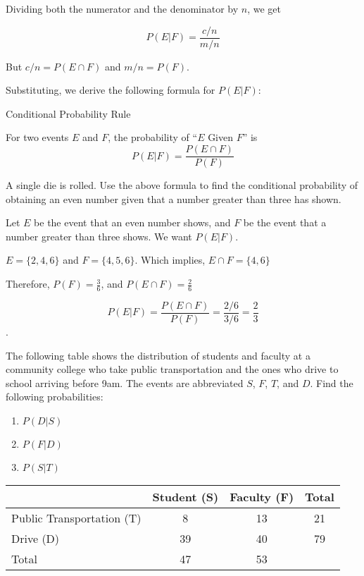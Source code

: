 Dividing both the numerator and the denominator by \(n\), we get

\[
    P(E | F) = \frac{c/n}{m/n}
\]

But \(c/n = P(E \cap F)\) and \(m/n = P(F)\).

Substituting, we derive the following formula for \(P(E | F)\):

\begin{summarybox}{Conditional Probability Rule}

    For two events $E$ and $F$, the probability of ``$E$ Given $F$'' is
    \[
        P(E | F) = \frac{P(E \cap F)}{P(F)}
    \]
\end{summarybox}

\begin{example}
    A single die is rolled. Use the above formula to find the conditional probability of obtaining an even number given that a number greater than three has shown.
\end{example}

\begin{solution}
    Let \( E \) be the event that an even number shows, and \( F \) be the event that a number greater than three shows. We want \( P(E | F) \).

    \( E = \{2, 4, 6\} \) and \( F = \{4, 5, 6\} \). Which implies, \( E \cap F = \{4, 6\} \)

    Therefore, \( P(F) = \frac{3}{6} \), and \( P(E \cap F) = \frac{2}{6} \)

    \[ P(E | F) = \frac{P(E \cap F)}{P(F)} = \frac{2/6}{3/6} = \frac{2}{3} \].
\end{solution}

\begin{example}
    The following table shows the distribution of students and faculty at a community college who take public transportation and the ones who drive to school arriving before 9am. The events are abbreviated \(S\), \(F\), \(T\), and \(D\). Find the following probabilities:
    \begin{enumerate}
        \item \(P(D | S)\)
        \item \(P(F | D)\)
        \item \(P(S | T)\)
    \end{enumerate}
\end{example}

\begin{table}[ht]
    \centering
    \begin{tabular}{|l|c|c|c|}
        \hline
                                  & Student (S) & Faculty (F) & Total \\
        \hline
        Public Transportation (T) & 8           & 13          & 21    \\
        Drive (D)                 & 39          & 40          & 79    \\
        Total                     & 47          & 53          &       \\
        \hline
    \end{tabular}
\end{table}

